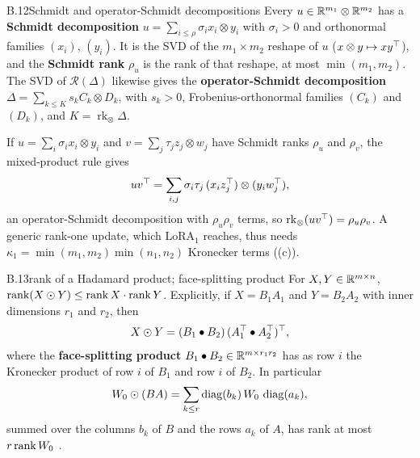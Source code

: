 \begin{bgentry}{B.12}{Schmidt and operator-Schmidt decompositions}
Every $u\in\mathbb{R}^{m_1}\otimes\mathbb{R}^{m_2}$ has a \textbf{Schmidt decomposition} $u=\sum_{i\le\rho}\sigma_ix_i\otimes y_i$ with
$\sigma_i>0$ and orthonormal families $(x_i)$, $(y_i)$. It is the SVD of the $m_1\times m_2$ reshape of $u$
($x\otimes y\mapsto xy^{\top}$), and the \textbf{Schmidt rank} $\rho_u$ is the rank of that reshape, at most
$\min(m_1,m_2)$. The SVD of $\mathcal R(\Delta)$ likewise gives the \textbf{operator-Schmidt decomposition}
$\Delta=\sum_{k\le K}s_kC_k\otimes D_k$, with $s_k>0$, Frobenius-orthonormal families $(C_k)$ and $(D_k)$, and
$K=\operatorname{rk}_\otimes\Delta$.
\end{bgentry}

If $u=\sum_i\sigma_ix_i\otimes y_i$ and $v=\sum_j\tau_jz_j\otimes w_j$ have Schmidt ranks $\rho_u$ and $\rho_v$, the
mixed-product rule gives
\begin{equation*}
  uv^{\top}=\sum_{i,j}\sigma_i\tau_j\,(x_iz_j^{\top})\otimes(y_iw_j^{\top}),
\end{equation*}
an operator-Schmidt decomposition with $\rho_u\rho_v$ terms, so $\operatorname{rk}_\otimes(uv^{\top})=\rho_u\rho_v$. A generic
rank-one update, which $\mathrm{LoRA}_1$ reaches, thus needs $\kappa_1=\min(m_1,m_2)\min(n_1,n_2)$ Kronecker terms
((c)).


\begin{bgfact}{B.13}{rank of a Hadamard product; face-splitting product}
For $X,Y\in\mathbb{R}^{m\times n}$, $\operatorname{rank}(X\odot Y)\le\operatorname{rank} X\cdot\operatorname{rank} Y$. Explicitly, if $X=B_1A_1$ and $Y=B_2A_2$ with inner
dimensions $r_1$ and $r_2$, then
\begin{equation*}
  X\odot Y=(B_1\bullet B_2)\,(A_1^{\top}\bullet A_2^{\top})^{\top},
\end{equation*}
where the \textbf{face-splitting product} $B_1\bullet B_2\in\mathbb{R}^{m\times r_1r_2}$ has as row $i$ the Kronecker product of
row $i$ of $B_1$ and row $i$ of $B_2$. In particular
\begin{equation*}
  W_0\odot(BA)=\sum_{k\le r}\operatorname{diag}(b_k)\,W_0\,\operatorname{diag}(a_k),
\end{equation*}
summed over the columns $b_k$ of $B$ and the rows $a_k$ of $A$, has rank at most $r\operatorname{rank} W_0$
\citep[Ch.~5]{xhorn1991topics}.
\end{bgfact}

